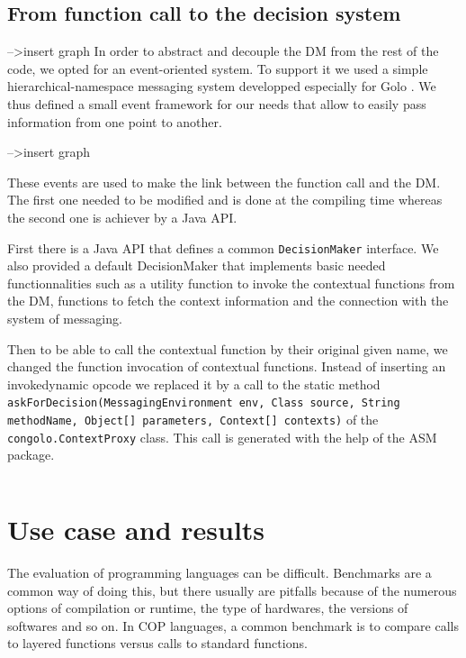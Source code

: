 \documentclass[a4paper]{article}
\begin{document}
\subsection{From function call to the decision system}
-->insert graph
In order to abstract and decouple the DM from the rest of the code, we opted for an event-oriented system. To support it we used a simple hierarchical-namespace messaging system developped especially for Golo \cite{flemouel_gololang-messaging_2013}. We thus defined a small event framework for our needs that allow to easily pass information from one point to another.

-->insert graph

These events are used to make the link between the function call and the DM. The first one needed to be modified and is done at the compiling time whereas the second one is achiever by a Java API.

First there is a Java API that defines a common \lstinline|DecisionMaker| interface. We also provided a default DecisionMaker that implements basic needed functionnalities such as a utility function to invoke the contextual functions from the DM, functions to fetch the context information and the connection with the system of messaging.

Then to be able to call the contextual function by their original given name, we changed the function invocation of contextual functions. Instead of inserting an invokedynamic opcode we replaced it by a call to the static method \lstinline|askForDecision(MessagingEnvironment env, Class source, String methodName, Object[] parameters, Context[] contexts)| of the \lstinline|congolo.ContextProxy| class. This call is generated with the help of the ASM package.

\begin{lstlisting}[float, language=Java, caption=Proxy generation - LocalReferenceAssignmentAndVerificationVisitor.java, label={listing:implswitch}]

\end{lstlisting}


\section{Use case and results}
\label{section:results}
The evaluation of programming languages can be difficult. Benchmarks are a common way of doing this, but there usually are pitfalls because of the numerous options of compilation or runtime, the type of hardwares, the versions of softwares and so on. In COP languages, a common benchmark is to compare calls to layered functions versus calls to standard functions.
\end{document}

